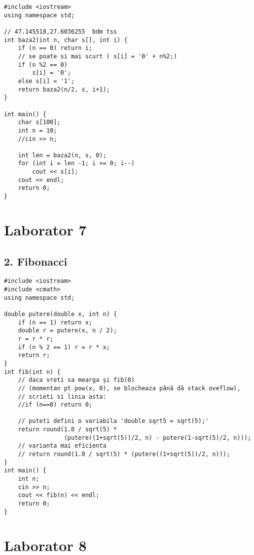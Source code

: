 \documentclass[11pt]{article}
\begin{document}
\begin{verbatim}
#include <iostream>
using namespace std;

// 47.145518,27.6036255  bdm tss
int baza2(int n, char s[], int i) {
    if (n == 0) return i;
    // se poate si mai scurt ( s[i] = '0' + n%2;)
    if (n %2 == 0)
        s[i] = '0';
    else s[i] = '1';
    return baza2(n/2, s, i+1);
} 

int main() {
    char s[100];
    int n = 10;
    //cin >> n;

    int len = baza2(n, s, 0);
    for (int i = len -1; i >= 0; i--)
        cout << s[i];
    cout << endl;
    return 0;
}

\end{verbatim}
\pagebreak

\section*{Laborator 7}
\label{sec:org7827a26}
\subsection*{2. Fibonacci}
\label{sec:org509a009}
\begin{verbatim}
#include <iostream>
#include <cmath>
using namespace std;

double putere(double x, int n) {
    if (n == 1) return x;
    double r = putere(x, n / 2);
    r = r * r;
    if (n % 2 == 1) r = r * x;
    return r;
}
int fib(int n) {
    // daca vreti sa mearga și fib(0) 
    // (momentan pt pow(x, 0), se blocheaza până dă stack oveflow),
    // scrieti si linia asta:
    //if (n==0) return 0;

    // puteti defini o variabila 'double sqrt5 = sqrt(5);'
    return round(1.0 / sqrt(5) * 
                 (putere((1+sqrt(5))/2, n) - putere(1-sqrt(5)/2, n)));
    // varianta mai eficienta
    // return round(1.0 / sqrt(5) * (putere((1+sqrt(5))/2, n)));
}
int main() {
    int n;
    cin >> n;
    cout << fib(n) << endl;
    return 0;
}
\end{verbatim}

\pagebreak
\section*{Laborator 8}
\label{sec:org6633bbe}
\end{document}
